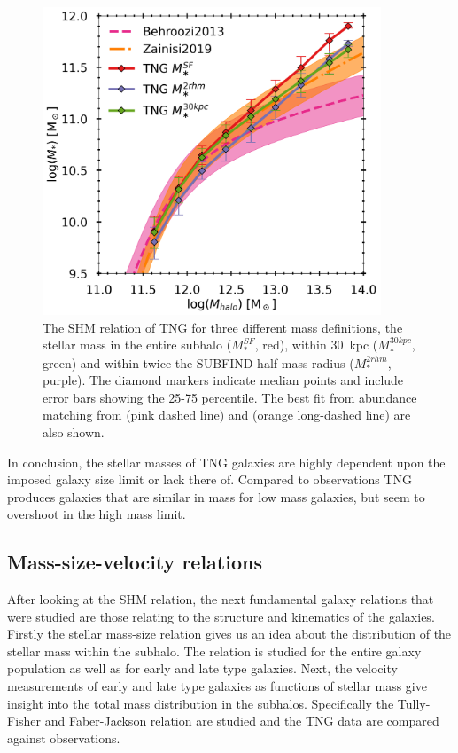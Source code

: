 \begin{figure}
    \centering
    \includegraphics[width=0.9\textwidth]{images/shmr.png}
    \caption{The SHM relation of TNG for three different mass definitions, the stellar mass in the entire subhalo ($M_\ast^{SF}$, red), within 30$\,$ kpc ($M_\ast^{30kpc}$, green) and within twice the SUBFIND half mass radius ($M_\ast^{2rhm}$, purple). The diamond markers indicate median points and include error bars showing the 25-75 percentile. The best fit from abundance matching from \textcite{Behroozi2013} (pink dashed line) and \textcite{Zanisi2019} (orange long-dashed line) are also shown.}
    \label{shmr}
\end{figure}

In conclusion, the stellar masses of TNG galaxies are highly dependent upon the imposed galaxy size limit or lack there of. Compared to observations TNG produces galaxies that are similar in mass for low mass galaxies, but seem to overshoot in the high mass limit.

\subsection{Mass-size-velocity relations}
After looking at the SHM relation, the next fundamental galaxy relations that were studied are those relating to the structure and kinematics of the galaxies. Firstly the stellar mass-size relation gives us an idea about the distribution of the stellar mass within the subhalo. The relation is studied for the entire galaxy population as well as for early and late type galaxies. Next, the velocity measurements of early and late type galaxies as functions of stellar mass give insight into the total mass distribution in the subhalos. Specifically the Tully-Fisher and Faber-Jackson relation are studied and the TNG data are compared against observations.

